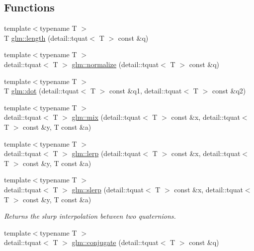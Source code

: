 \subsection*{Functions}
\begin{DoxyCompactItemize}
\item 
{\footnotesize template$<$typename T $>$ }\\T \hyperlink{group__gtc__quaternion_ga60d5647f87c2c423497d0f3bf8c407b8}{glm\+::length} (detail\+::tquat$<$ T $>$ const \&q)
\item 
{\footnotesize template$<$typename T $>$ }\\detail\+::tquat$<$ T $>$ \hyperlink{group__gtc__quaternion_gabd269bb967469a6f1df5963455fee6be}{glm\+::normalize} (detail\+::tquat$<$ T $>$ const \&q)
\item 
{\footnotesize template$<$typename T $>$ }\\T \hyperlink{group__gtc__quaternion_gab9101d7f5b27ca682fc84e32b8fd70ad}{glm\+::dot} (detail\+::tquat$<$ T $>$ const \&q1, detail\+::tquat$<$ T $>$ const \&q2)
\item 
{\footnotesize template$<$typename T $>$ }\\detail\+::tquat$<$ T $>$ \hyperlink{group__gtc__quaternion_gaaea9592fd53952b636d680321edcdb31}{glm\+::mix} (detail\+::tquat$<$ T $>$ const \&x, detail\+::tquat$<$ T $>$ const \&y, T const \&a)
\item 
{\footnotesize template$<$typename T $>$ }\\detail\+::tquat$<$ T $>$ \hyperlink{group__gtc__quaternion_ga91c6605e46a8c70c8e25bbc0f41da181}{glm\+::lerp} (detail\+::tquat$<$ T $>$ const \&x, detail\+::tquat$<$ T $>$ const \&y, T const \&a)
\item 
{\footnotesize template$<$typename T $>$ }\\detail\+::tquat$<$ T $>$ \hyperlink{group__gtc__quaternion_ga5c6e56a6e55257d9fc0290df2929ec4a}{glm\+::slerp} (detail\+::tquat$<$ T $>$ const \&x, detail\+::tquat$<$ T $>$ const \&y, T const \&a)
\begin{DoxyCompactList}\small\item\em Returns the slurp interpolation between two quaternions. \end{DoxyCompactList}\item 
{\footnotesize template$<$typename T $>$ }\\detail\+::tquat$<$ T $>$ \hyperlink{group__gtc__quaternion_ga8b6594dffb8bf455d848ffa2169ba41d}{glm\+::conjugate} (detail\+::tquat$<$ T $>$ const \&q)
\item 

\end{DoxyCompactItemize}
